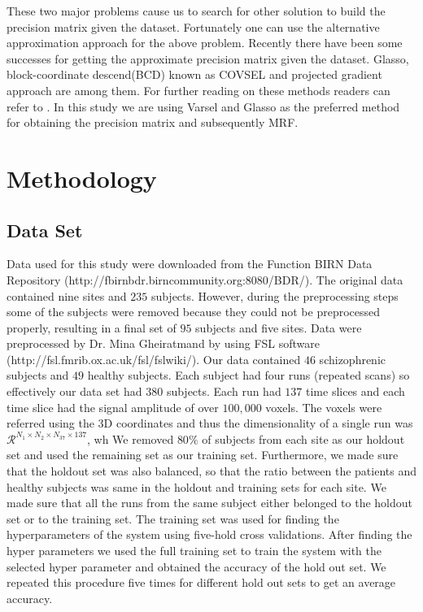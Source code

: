 \documentclass{article} %
\begin{document}
These two major problems cause us to search for other solution to build the 
precision matrix given the dataset. Fortunately one can use the alternative 
approximation approach for the above problem. Recently there have been some 
successes for getting the approximate precision matrix given the dataset. 
Glasso\cite{glasso}, block-coordinate descend(BCD) known as COVSEL and projected gradient 
approach are among them. For further reading on these methods readers can 
refer to \cite{Rish2014Book}. In this study we are using Varsel and Glasso as 
the preferred method for obtaining the precision matrix and subsequently MRF.   


\section{Methodology}

\subsection{Data Set}
Data used for this study were downloaded from the Function BIRN Data 
Repository (http://fbirnbdr.birncommunity.org:8080/BDR/). The original 
data contained nine sites and $235$ subjects. However, during the 
preprocessing steps some of the subjects were removed because they could
not be preprocessed properly, resulting in a final set of $95$ 
subjects and five sites. Data were preprocessed by Dr. Mina Gheiratmand by 
using FSL software (http://fsl.fmrib.ox.ac.uk/fsl/fslwiki/). Our data 
contained $46$ schizophrenic subjects and $49$ healthy subjects. Each subject 
had four runs (repeated scans) so effectively our data set had $380$ subjects. Each run had 
$137$ time slices and each time slice had the signal amplitude of over 
$100,000$ voxels. The voxels were referred using the 3D coordinates and thus 
the dimensionality of a single run was 
$\mathcal R^{N_1 \times N_2 \times N_37 \times 137}$, wh
We removed $80\%$ of subjects from each site as our holdout set and used the 
remaining set as our training set. Furthermore, we made sure that the holdout 
set was also balanced, so that the ratio between the patients and healthy 
subjects was same in the holdout and training sets for each site. We made 
sure that all the runs from the same subject either belonged to the holdout 
set or to the training set. The training set was used for finding the 
hyperparameters of the system using five-hold cross validations. After finding 
the hyper parameters we used the full training set to train the system with 
the selected hyper parameter and obtained the accuracy of the hold out set. 
We repeated this procedure five times for different hold out sets 
to get an average accuracy. 
\end{document}
